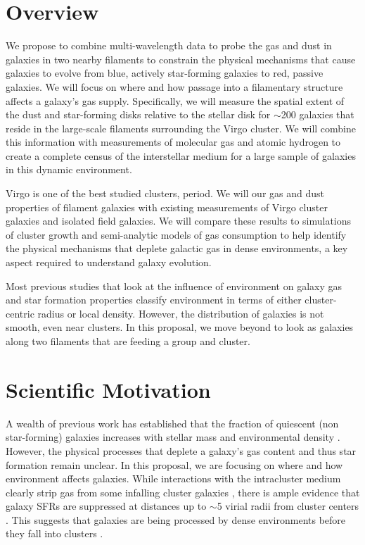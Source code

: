 \documentclass[12pt, preprint]{aastex}
\begin{document}
\section{Overview}
\vspace*{-.4cm}
We propose to combine multi-wavelength data to probe the gas and dust
in galaxies in two nearby filaments to constrain the physical mechanisms that cause galaxies to evolve from 
blue, actively star-forming galaxies to red, passive galaxies. We will focus on where 
and how passage into a filamentary structure affects a galaxy's gas
supply.  Specifically, we will measure the spatial extent 
of the dust and star-forming disks relative to the stellar disk for $\sim$200
galaxies that reside in the large-scale filaments surrounding the
Virgo cluster.  We will combine this information with measurements of
molecular gas and atomic hydrogen to create a complete census of the
interstellar medium for a large sample of galaxies in this dynamic
environment.  

Virgo is one of the best studied clusters, period.  
We will our gas and dust properties of
filament galaxies with existing measurements of Virgo cluster galaxies
and isolated field galaxies.  
We will compare these results to simulations of cluster growth and
semi-analytic models of gas consumption to help identify the physical mechanisms 
that deplete galactic gas in dense environments, a key aspect required to understand galaxy evolution. 

Most previous studies that look at the influence of environment on
galaxy gas and star formation properties classify environment in terms
of either cluster-centric radius or local density.  However, the
distribution of galaxies is not smooth, even near clusters.  In this
proposal, we move beyond  to look as galaxies along two filaments that
are feeding a group and cluster.


\vspace*{-1cm}
\section{Scientific Motivation}
\vspace*{-.4cm}

A wealth of previous work has established that the fraction of
quiescent (non star-forming) galaxies increases with
stellar mass and environmental density \citep[e.g.][]{dale01,kauffmann04,peng10}.
However, the physical processes that deplete a galaxy's gas content and
thus star formation remain unclear.  
In this proposal, we are focusing on where and how environment affects galaxies.  
While interactions with the intracluster medium clearly strip gas
from some infalling cluster galaxies \citep[e.g.][]{chung07}, there
is ample evidence that galaxy SFRs are suppressed at distances up
to $\sim$5 virial radii from cluster centers \citep{lewis02,bahe13}.  
This suggests that galaxies are being processed by dense environments before they
fall into clusters \citep[e.g.][]{poggianti99,cortese06}.  
\end{document}
